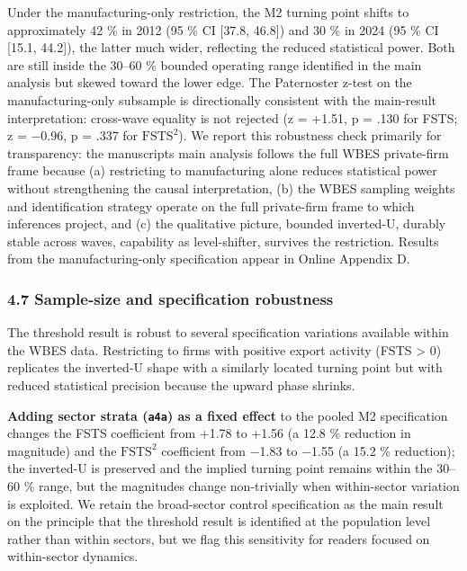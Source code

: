 \documentclass[12pt,a4paper]{article}
\begin{document}
Under the manufacturing-only restriction, the M2 turning point shifts to
approximately 42 \% in 2012 (95 \% CI {[}37.8, 46.8{]}) and 30 \% in
2024 (95 \% CI {[}15.1, 44.2{]}), the latter much wider, reflecting the
reduced statistical power. Both are still inside the 30--60 \% bounded
operating range identified in the main analysis but skewed toward the
lower edge. The Paternoster z-test on the manufacturing-only subsample
is directionally consistent with the main-result interpretation:
cross-wave equality is not rejected (z = +1.51, p = .130 for FSTS; z =
−0.96, p = .337 for \(\mathrm{FSTS}^2\)). We report this robustness
check primarily for transparency: the manuscript\textquotesingle s main
analysis follows the full WBES private-firm frame because (a)
restricting to manufacturing alone reduces statistical power without
strengthening the causal interpretation, (b) the WBES sampling weights
and identification strategy operate on the full private-firm frame to
which inferences project, and (c) the qualitative picture, bounded
inverted-U, durably stable across waves, capability as level-shifter,
survives the restriction. Results from the manufacturing-only
specification appear in Online Appendix D.

\hypertarget{47-samplesize-and-specification-robustness}{%
\subsubsection{4.7 Sample‑size and specification
robustness}\label{47-samplesize-and-specification-robustness}}

The threshold result is robust to several specification variations
available within the WBES data. Restricting to firms with positive
export activity (FSTS \textgreater{} 0) replicates the inverted‑U shape
with a similarly located turning point but with reduced statistical
precision because the upward phase shrinks.

\textbf{Adding sector strata (\texttt{a4a}) as a fixed effect} to the
pooled M2 specification changes the FSTS coefficient from +1.78 to +1.56
(a 12.8 \% reduction in magnitude) and the \(\mathrm{FSTS}^2\)
coefficient from −1.83 to −1.55 (a 15.2 \% reduction); the inverted-U is
preserved and the implied turning point remains within the 30--60 \%
range, but the magnitudes change non-trivially when within-sector
variation is exploited. We retain the broad-sector control specification
as the main result on the principle that the threshold result is
identified at the population level rather than within sectors, but we
flag this sensitivity for readers focused on within-sector dynamics.
\end{document}
